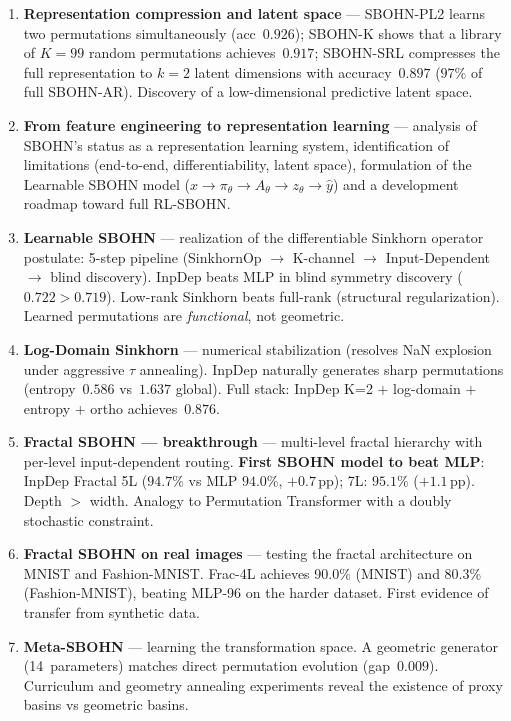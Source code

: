 \documentclass[11pt,a4paper]{report}
\begin{document}
\begin{enumerate}
\item \textbf{Representation compression and latent space} --- SBOHN-PL2 learns two permutations simultaneously (acc~$0.926$); SBOHN-K shows that a library of $K{=}99$ random permutations achieves~$0.917$; SBOHN-SRL compresses the full representation to $k{=}2$ latent dimensions with accuracy~$0.897$ ($97\%$ of full SBOHN-AR). Discovery of a low-dimensional predictive latent space.

\item \textbf{From feature engineering to representation learning} --- analysis of SBOHN's status as a representation learning system, identification of limitations (end-to-end, differentiability, latent space), formulation of the Learnable SBOHN model ($x{\to}\pi_\theta{\to}A_\theta{\to}z_\theta{\to}\hat{y}$) and a development roadmap toward full RL-SBOHN.

\item \textbf{Learnable SBOHN} --- realization of the differentiable Sinkhorn operator postulate: 5-step pipeline (SinkhornOp $\to$ K-channel $\to$ Input-Dependent $\to$ blind discovery). InpDep beats MLP in blind symmetry discovery ($0.722 > 0.719$). Low-rank Sinkhorn beats full-rank (structural regularization). Learned permutations are \emph{functional}, not geometric.

\item \textbf{Log-Domain Sinkhorn} --- numerical stabilization (resolves NaN explosion under aggressive $\tau$ annealing). InpDep naturally generates sharp permutations (entropy~$0.586$ vs~$1.637$ global). Full stack: InpDep K=2 + log-domain + entropy + ortho achieves~$0.876$.

\item \textbf{Fractal SBOHN --- breakthrough} --- multi-level fractal hierarchy with per-level input-dependent routing. \textbf{First SBOHN model to beat MLP}: InpDep Fractal 5L ($94.7\%$ vs MLP $94.0\%$, $+0.7$\,pp); 7L: $95.1\%$ ($+1.1$\,pp). Depth $>$ width. Analogy to Permutation Transformer with a doubly stochastic constraint.

\item \textbf{Fractal SBOHN on real images} --- testing the fractal architecture on MNIST and Fashion-MNIST. Frac-4L achieves 90.0\% (MNIST) and 80.3\% (Fashion-MNIST), beating MLP-96 on the harder dataset. First evidence of transfer from synthetic data.

\item \textbf{Meta-SBOHN} --- learning the transformation space. A geometric generator (14~parameters) matches direct permutation evolution (gap~$0.009$). Curriculum and geometry annealing experiments reveal the existence of proxy basins vs geometric basins.


\end{enumerate}
\end{document}
